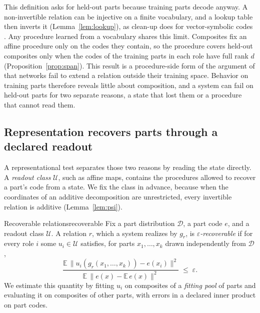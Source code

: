 \documentclass[10pt]{article}
\theoremstyle{plain}
\theoremstyle{remark}
\newcommand{\U}{\mathcal{U}}
\newcommand{\D}{\mathcal{D}}
\begin{document}
This definition asks for held-out parts because training parts decode anyway. A non-invertible relation can be injective on a finite vocabulary, and a lookup table then inverts it (Lemma~\ref{lem:lookup}), as clean-up does for vector-symbolic codes \citep{plate2003,frady2018}. Any procedure learned from a vocabulary shares this limit. Composites fix an affine procedure only on the codes they contain, so the procedure covers held-out composites only when the codes of the training parts in each role have full rank $d$ (Proposition~\ref{prop:span}). This result is a procedure-side form of the argument of \citet{marcus1998} that networks fail to extend a relation outside their training space. Behavior on training parts therefore reveals little about composition, and a system can fail on held-out parts for two separate reasons, a state that lost them or a procedure that cannot read them.

\subsection{Representation recovers parts through a declared readout}
\label{sec:repcomp}

A representational test separates those two reasons by reading the state directly. A \emph{readout class} $\U$, such as affine maps, contains the procedures allowed to recover a part's code from a state. We fix the class in advance, because when the coordinates of an additive decomposition are unrestricted, every invertible relation is additive (Lemma~\ref{lem:psi}).

\begin{defbox}{Recoverable relations}{recoverable}
Fix a part distribution $\D$, a part code $e$, and a readout class $\U$. A relation $r$, which a system realizes by $g_r$, is \emph{$\varepsilon$-recoverable} if for every role $i$ some $u_i \in \U$ satisfies, for parts $x_1, \ldots, x_k$ drawn independently from $\D$,
\begin{equation}
  \frac{\mathbb{E}\,\lVert u_i(g_r(x_1,\ldots,x_k)) - e(x_i) \rVert^2}{\mathbb{E}\,\lVert e(x) - \mathbb{E}\,e(x) \rVert^2} \;\le\; \varepsilon .
  \label{eq:recover}
\end{equation}
We estimate this quantity by fitting $u_i$ on composites of a \emph{fitting pool} of parts and evaluating it on composites of other parts, with errors in a declared inner product on part codes.
\end{defbox}
\end{document}
